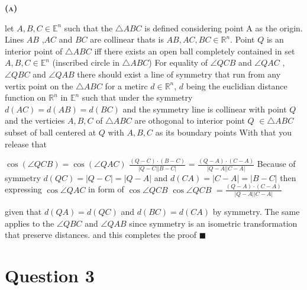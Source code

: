 \documentclass[a4paper, 12pt]{article}
\begin{document}
\begin{center}
    \fontsize{24pt}{10pt}\selectfont
    \textsc{\textbf{(a)}}
\end{center}

let $A,B,C \in \mathbb{E}^n$ such that the $\triangle ABC$ is defined considering point A as the origin.
Lines $AB$ ,$AC$ and $BC$ are collinear thats is $AB ,AC ,BC \in  \mathbb{R}^n$. Point $Q$ is an interior point of $\triangle ABC$
iff there exists an open ball completely contained in set $A,B,C \in \mathbb{E}^n$ (inscribed circle in $\triangle ABC$)
For equality of $\angle QCB$ and $\angle QAC$ , $\angle QBC$ and  $\angle QAB$ there should exist a line of symmetry that run
from any vertix point on the $\triangle ABC$ for a metirc $d \in \mathbb{R}^n$, $d$ 
being the euclidian distance function on $\mathbb{R}^n$  in   $\mathbb{E}^n$ such that under the symmetry $d(AC) = d(AB) = d(BC)$
and the symmetry line is collinear with point $Q$ and the verticies $A ,B ,C$ of $\triangle ABC$ 
are othogonal to interior point $Q$ $\in \triangle ABC$ subset of ball centered at $Q$ with $A, B, C$ as its boundary points
With that you release that 
\begin{center}
    $\cos (\angle QCB) = \cos (\angle QAC)$ \newline
    $\frac{(Q-C)\cdot (B-C)}{\left\lvert Q-C \right\rvert \left\lvert B-C \right\rvert }$ = 
    $\frac{(Q-A)\cdot (C-A)}{\left\lvert Q-A \right\rvert \left\lvert C-A \right\rvert }$
    Because of symmetry $d(QC) = \left\lvert Q-C \right\rvert = \left\lvert Q-A \right\rvert$ and\newline
    $d(CA) = \left\lvert C-A  \right\rvert = \left\lvert B-C \right\rvert$ then expressing \newline
    $\cos\angle QAC$ in form of $\cos\angle QCB$ \newline
    $\cos\angle QCB$ $ = \frac{(Q-A)\cdot (C-A)}{\left\lvert Q-A \right\rvert \left\lvert C-A \right\rvert }$ \newline
\end{center}
given that $d(QA) = $$d(QC)$ and $d(BC) = $$d(CA)$ by symmetry.
The same applies to the $\angle QBC$ and $\angle QAB$ since symmetry is an isometric transformation that preserve distances.
and this completes the proof $\blacksquare$

\newpage

\section{Question 3}
\end{document}
